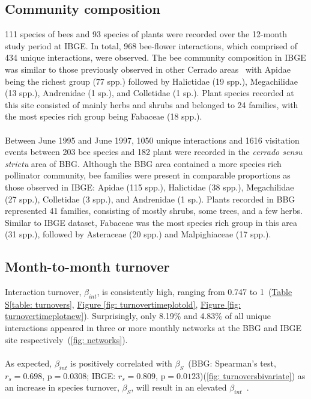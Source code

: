 \documentclass[11pt]{article}
\begin{document}
\subsection{Community composition}
111 species of bees and 93 species of plants were recorded over the 12-month study period at IBGE. In total, 968 bee-flower interactions, which comprised of 434 unique interactions, were observed. The bee community composition in IBGE was similar to those previously observed in other Cerrado areas~\citep{Pinheiro-Machado2002} with Apidae being the richest group (77 spp.) followed by Halictidae (19 spp.), Megachilidae (13 spp.), Andrenidae (1 sp.), and Colletidae (1 sp.). Plant species recorded at this site consisted of mainly herbs and shrubs and belonged to 24 families, with the most species rich group being Fabaceae (18 spp.). \\
\\
Between June 1995 and June 1997, 1050 unique interactions and 1616 visitation events between 203 bee species and 182 plant were recorded in the \textit{cerrado sensu strictu} area of BBG. Although the BBG area contained a more species rich pollinator community, bee families were present in comparable proportions as those observed in IBGE: Apidae (115 spp.), Halictidae (38 spp.), Megachilidae (27 spp.), Colletidae (3 spp.), and Andrenidae (1 sp.). Plants recorded in BBG represented 41 families, consisting of mostly shrubs, some trees, and a few herbs. Similar to IBGE dataset, Fabaceae was the most species rich group in this area (31 spp.), followed by Asteraceae (20 spp.) and Malpighiaceae (17 spp.). \\

\subsection{Month-to-month turnover}
\label{subsec: turnover} 

Interaction turnover, $\beta_{int}$, is consistently high, ranging from 0.747 to 1~(\hyperref[table: turnovers]{Table S\ref{table: turnovers}}, \hyperref[fig: turnovertimeplotold]{Figure \ref{fig: turnovertimeplotold}}, \hyperref[fig: turnovertimeplotnew]{Figure \ref{fig: turnovertimeplotnew}}). Surprisingly, only 8.19\% and 4.83\% of all unique interactions appeared in three or more monthly networks at the BBG and IBGE site respectively~(\autoref{fig: networks}).\\
\\
As expected, $\beta_{int}$ is positively correlated with $\beta_{S}$~(BBG: Spearman's test, $r_{s}=0.698$, $\text{p}=0.0308$; IBGE: $r_{s}=0.809$, $\text{p}=0.0123$)(\autoref{fig: turnoversbivariate}) as an increase in species turnover, $\beta_{S}$, will result in an elevated $\beta_{int}$~\citep{Poisot2012}.
\end{document}

